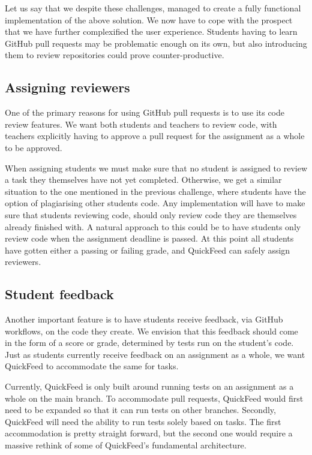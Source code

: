 Let us say that we despite these challenges, managed to create a fully functional implementation of the above solution.
We now have to cope with the prospect that we have further complexified the user experience.
Students having to learn GitHub pull requests may be problematic enough on its own, but also introducing them to review repositories could prove counter-productive.

\subsection{Assigning reviewers}

One of the primary reasons for using GitHub pull requests is to use its code review features.
We want both students and teachers to review code, with teachers explicitly having to approve a pull request for the assignment as a whole to be approved.

When assigning students we must make sure that no student is assigned to review a task they themselves have not yet completed.
Otherwise, we get a similar situation to the one mentioned in the previous challenge, where students have the option of plagiarising other students code.
Any implementation will have to make sure that students reviewing code, should only review code they are themselves already finished with.
A natural approach to this could be to have students only review code when the assignment deadline is passed.
At this point all students have gotten either a passing or failing grade, and QuickFeed can safely assign reviewers.


\subsection{Student feedback}

Another important feature is to have students receive feedback, via GitHub workflows, on the code they create.
We envision that this feedback should come in the form of a score or grade, determined by tests run on the student's code.
Just as students currently receive feedback on an assignment as a whole, we want QuickFeed to accommodate the same for tasks.

Currently, QuickFeed is only built around running tests on an assignment as a whole on the main branch.
To accommodate pull requests, QuickFeed would first need to be expanded so that it can run tests on other branches.
Secondly, QuickFeed will need the ability to run tests solely based on tasks.
The first accommodation is pretty straight forward, but the second one would require a massive rethink of some of QuickFeed's fundamental architecture.

